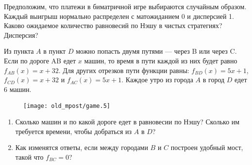 
\begin{problem}
 Предположим, что платежи в биматричной игре выбираются случайным
образом. Каждый выигрыш нормально распределен с матожиданием 0 и
дисперсией 1. Каково ожидаемое количество равновесий по Нэшу в
чистых стратегиях? Дисперсия?



\begin{sol}

\end{sol}
\end{problem}




\begin{problem}[Мост]

Из пункта $A$ в пункт $D$ можно попасть двумя путями --- через B или
через C. Если по дороге AB едет $x$ машин, то время в пути каждой
из них будет равно $f_{AB}(x)=x+32$. Для других отрезков пути
функции равны: $f_{BD}(x)=5x+1$, $f_{CD}(x)=x+32$ и
$f_{AC}(x)=5x+1$.
Каждое утро из города $A$ в город $D$ едет 6 машин. \par
\begin{figure}[ht]
     \texttt{[image: old\_mpost/game.5]}
\end{figure}

\begin{enumerate}
\item Сколько машин и по какой дороге едет в равновесии по Нэшу?
Сколько им требуется времени, чтобы добраться из $A$ в $D$? \par
\item Как изменятся ответы, если между городами $B$ и $C$ построен
удобный мост, такой что $f_{BC}=0$?
\end{enumerate}


\begin{sol}

\end{sol}
\end{problem}



